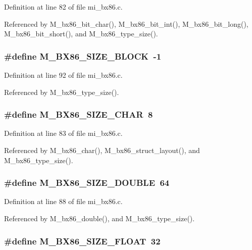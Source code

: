 Definition at line 82 of file mi\_\-bx86.c.

Referenced by M\_\-bx86\_\-bit\_\-char(), M\_\-bx86\_\-bit\_\-int(), M\_\-bx86\_\-bit\_\-long(), M\_\-bx86\_\-bit\_\-short(), and M\_\-bx86\_\-type\_\-size().
\subsubsection{\setlength{\rightskip}{0pt plus 5cm}\#define M\_\-BX86\_\-SIZE\_\-BLOCK~-1}\label{mi__bx86_8c_905496c8a58cf3acf671b0b757ac2a00}




Definition at line 92 of file mi\_\-bx86.c.

Referenced by M\_\-bx86\_\-type\_\-size().
\subsubsection{\setlength{\rightskip}{0pt plus 5cm}\#define M\_\-BX86\_\-SIZE\_\-CHAR~8}\label{mi__bx86_8c_c5f61a596116316673f895d36b233a9b}




Definition at line 83 of file mi\_\-bx86.c.

Referenced by M\_\-bx86\_\-char(), M\_\-bx86\_\-struct\_\-layout(), and M\_\-bx86\_\-type\_\-size().
\subsubsection{\setlength{\rightskip}{0pt plus 5cm}\#define M\_\-BX86\_\-SIZE\_\-DOUBLE~64}\label{mi__bx86_8c_c6f542cc79941edba2a6d9d66cb86ed7}




Definition at line 88 of file mi\_\-bx86.c.

Referenced by M\_\-bx86\_\-double(), and M\_\-bx86\_\-type\_\-size().
\subsubsection{\setlength{\rightskip}{0pt plus 5cm}\#define M\_\-BX86\_\-SIZE\_\-FLOAT~32}\label{mi__bx86_8c_31be9e8bfde01ea89a309d8fae094a3e}




